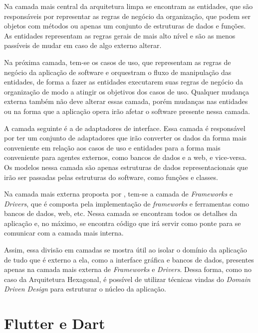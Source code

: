 \documentclass[12pt, %
openright, 
oneside, %
a4paper,    %
brazil]{facom-ufu-abntex2}
\begin{document}
Na camada mais central da arquitetura limpa se encontram as entidades, que são responsáveis por representar as regras de negócio da organização, que podem ser objetos com métodos ou apenas um conjunto de estruturas de dados e funções. As entidades representam as regras gerais de mais alto nível e são as menos passíveis de mudar em caso de algo externo alterar.

Na próxima camada, tem-se os casos de uso, que representam as regras de negócio da aplicação de software e orquestram o fluxo de manipulação das entidades, de forma a fazer as entidades executarem suas regras de negócio da organização de modo a atingir os objetivos dos casos de uso. Qualquer mudança externa também não deve alterar essas camada, porém mudanças nas entidades ou na forma que a aplicação opera irão afetar o software presente nessa camada.

A camada seguinte é a de adaptadores de interface. Essa camada é responsável por ter um conjunto de adaptadores que irão converter os dados da forma mais conveniente em relação aos casos de uso e entidades para a forma mais conveniente para agentes externos, como bancos de dados e a web, e vice-versa. Os modelos nessa camada são apenas estruturas de dados representacionais que irão ser passadas pelas estruturas do software, como funções e classes.

Na camada mais externa proposta por , tem-se a camada de \textit{Frameworks} e \textit{Drivers}, que é composta pela implementação de \textit{frameworks} e ferramentas como bancos de dados, web, etc. Nessa camada se encontram todos os detalhes da aplicação e, no máximo, se encontra código que irá servir como ponte para se comunicar com a camada mais interna.

Assim, essa divisão em camadas se mostra útil ao isolar o domínio da aplicação de tudo que é externo a ela, como a interface gráfica e bancos de dados, presentes apenas na camada mais externa de \textit{Frameworks} e \textit{Drivers}. Dessa forma, como no caso da Arquitetura Hexagonal, é possível de utilizar técnicas vindas do \textit{Domain Driven Design} para estruturar o núcleo da aplicação.

\section{Flutter e Dart} \label{sec:flutter_dart}
\end{document}
